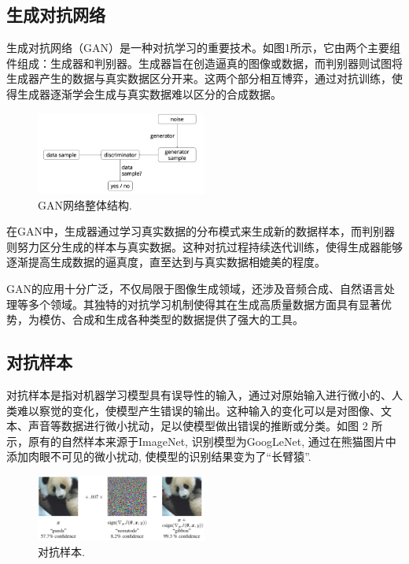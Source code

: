 \documentclass[twocolumn]{ctexart}
\renewcommand*{\songti}{\CJKfamily{zhsong}}%
\begin{document}
	\subsection{{\songti 生成对抗网络}\vspace{-0.6em}}
	生成对抗网络（GAN）是一种对抗学习的重要技术。如图1所示，它由两个主要组件组成：生成器和判别器。生成器旨在创造逼真的图像或数据，而判别器则试图将生成器产生的数据与真实数据区分开来。这两个部分相互博弈，通过对抗训练，使得生成器逐渐学会生成与真实数据难以区分的合成数据。
	\begin{figure}[htbp]
		\centering
		\includegraphics[width=0.5\textwidth]{fig1.png}
		\caption{GAN网络整体结构.}
		\label{fig}
	\end{figure}
	
	在GAN中，生成器通过学习真实数据的分布模式来生成新的数据样本，而判别器则努力区分生成的样本与真实数据。这种对抗过程持续迭代训练，使得生成器能够逐渐提高生成数据的逼真度，直至达到与真实数据相媲美的程度。
	
	GAN的应用十分广泛，不仅局限于图像生成领域，还涉及音频合成、自然语言处理等多个领域。其独特的对抗学习机制使得其在生成高质量数据方面具有显著优势，为模仿、合成和生成各种类型的数据提供了强大的工具。
	
	\subsection{{\songti 对抗样本}\vspace{-0.6em}}
	对抗样本是指对机器学习模型具有误导性的输入，通过对原始输入进行微小的、人类难以察觉的变化，使模型产生错误的输出。这种输入的变化可以是对图像、文本、声音等数据进行微小扰动，足以使模型做出错误的推断或分类。如图 2 所示，原有的自然样本来源于ImageNet, 识别模型为GoogLeNet, 通过在熊猫图片中添加肉眼不可见的微小扰动, 使模型的识别结果变为了“长臂猿”.
	\begin{figure}[htbp]
		\centering
		\includegraphics[width=0.5\textwidth]{fig2.png}
		\caption{对抗样本.}
		\label{fig}
	\end{figure}
	
\end{document}
